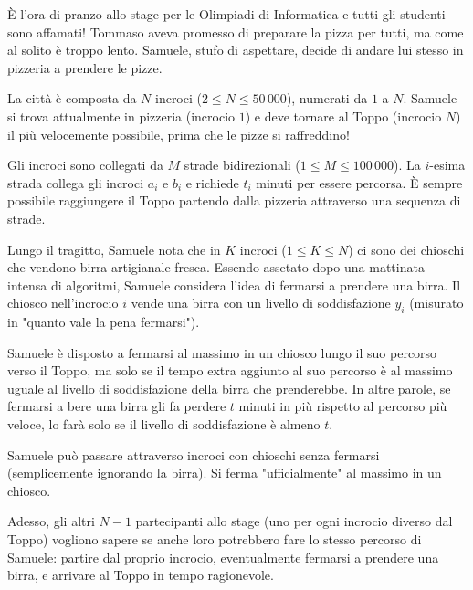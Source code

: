 \usepackage{xcolor}
\usepackage{afterpage}
\usepackage{pifont,mdframed}
\usepackage[bottom]{footmisc}

\newcommand{\inputfile}{\texttt{stdin}}
\newcommand{\outputfile}{\texttt{stdout}}
\makeatletter
\renewcommand{\this@inputfilename}{\texttt{stdin}}
\renewcommand{\this@outputfilename}{\texttt{stdout}}
\makeatother

È l'ora di pranzo allo stage per le Olimpiadi di Informatica e tutti gli studenti sono affamati! Tommaso aveva promesso di preparare la pizza per tutti, ma come al solito è troppo lento. Samuele, stufo di aspettare, decide di andare lui stesso in pizzeria a prendere le pizze.

La città è composta da $N$ incroci ($2 \le N \le 50\,000$), numerati da $1$ a $N$. Samuele si trova attualmente in pizzeria (incrocio $1$) e deve tornare al Toppo (incrocio $N$) il più velocemente possibile, prima che le pizze si raffreddino!

Gli incroci sono collegati da $M$ strade bidirezionali ($1 \le M \le 100\,000$). La $i$-esima strada collega gli incroci $a_i$ e $b_i$ e richiede $t_i$ minuti per essere percorsa. È sempre possibile raggiungere il Toppo partendo dalla pizzeria attraverso una sequenza di strade.

Lungo il tragitto, Samuele nota che in $K$ incroci ($1 \le K \le N$) ci sono dei chioschi che vendono birra artigianale fresca. Essendo assetato dopo una mattinata intensa di algoritmi, Samuele considera l'idea di fermarsi a prendere una birra. Il chiosco nell'incrocio $i$ vende una birra con un livello di soddisfazione $y_i$ (misurato in "quanto vale la pena fermarsi").

Samuele è disposto a fermarsi al massimo in un chiosco lungo il suo percorso verso il Toppo, ma solo se il tempo extra aggiunto al suo percorso è al massimo uguale al livello di soddisfazione della birra che prenderebbe. In altre parole, se fermarsi a bere una birra gli fa perdere $t$ minuti in più rispetto al percorso più veloce, lo farà solo se il livello di soddisfazione è almeno $t$.

\begin{warning}
Samuele può passare attraverso incroci con chioschi senza fermarsi (semplicemente ignorando la birra). Si ferma "ufficialmente" al massimo in un chiosco.
\end{warning}

Adesso, gli altri $N-1$ partecipanti allo stage (uno per ogni incrocio diverso dal Toppo) vogliono sapere se anche loro potrebbero fare lo stesso percorso di Samuele: partire dal proprio incrocio, eventualmente fermarsi a prendere una birra, e arrivare al Toppo in tempo ragionevole.

